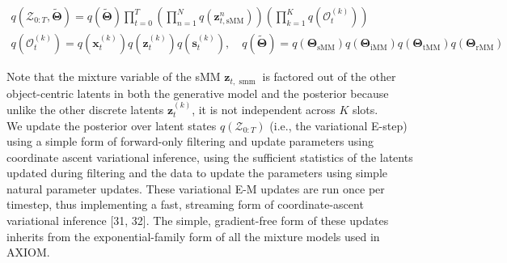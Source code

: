 \documentclass[10pt]{article}
\begin{document}
\begin{gather*}
q\left(\mathcal{Z}_{0: T}, \tilde{\boldsymbol{\Theta}}\right)=q(\tilde{\boldsymbol{\Theta}}) \prod_{t=0}^{T}\left(\prod_{n=1}^{N} q\left(\mathbf{z}_{t, \mathrm{sMM}}^{n}\right)\right)\left(\prod_{k=1}^{K} q\left(\mathcal{O}_{t}^{(k)}\right)\right)  \tag{8}\\
q\left(\mathcal{O}_{t}^{(k)}\right)=q\left(\mathbf{x}_{t}^{(k)}\right) q\left(\mathbf{z}_{t}^{(k)}\right) q\left(\mathbf{s}_{t}^{(k)}\right), \quad q(\tilde{\boldsymbol{\Theta}})=q\left(\boldsymbol{\Theta}_{\mathrm{sMM}}\right) q\left(\boldsymbol{\Theta}_{\mathrm{iMM}}\right) q\left(\boldsymbol{\Theta}_{\mathrm{tMM}}\right) q\left(\boldsymbol{\Theta}_{\mathrm{rMM}}\right) \tag{9}
\end{gather*}


Note that the mixture variable of the sMM $\mathbf{z}_{t, \text { smm }}$ is factored out of the other object-centric latents in both the generative model and the posterior because unlike the other discrete latents $\mathbf{z}_{t}^{(k)}$, it is not independent across $K$ slots.\\
We update the posterior over latent states $q\left(\mathcal{Z}_{0: T}\right)$ (i.e., the variational E-step) using a simple form of forward-only filtering and update parameters using coordinate ascent variational inference, using the sufficient statistics of the latents updated during filtering and the data to update the parameters using simple natural parameter updates. These variational E-M updates are run once per timestep, thus implementing a fast, streaming form of coordinate-ascent variational inference [31, 32]. The simple, gradient-free form of these updates inherits from the exponential-family form of all the mixture models used in AXIOM.
\end{document}
